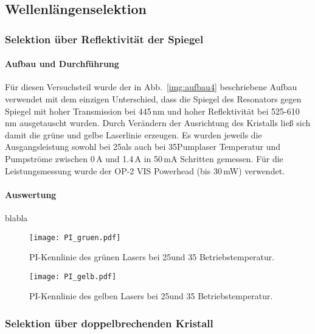 \subsection{Wellenlängenselektion}

\subsubsection{Selektion über Reflektivität der Spiegel}

\paragraph{Aufbau und Durchführung}

Für diesen Versuchsteil wurde der in Abb.~\ref{img:aufbau4} beschriebene Aufbau verwendet mit dem
einzigen Unterschied, dass die Spiegel des Resonators gegen Spiegel mit hoher Transmission bei
445\,nm und hoher Reflektivität bei 525-610\,nm ausgetauscht wurden.
Durch Verändern der Ausrichtung des Kristalls ließ sich damit die grüne und gelbe Laserlinie
erzeugen. Es wurden jeweils die Ausgangsleistung sowohl bei 25\grad als auch bei 35\grad Pumplaser
Temperatur und Pumpströme zwischen 0\,A und 1.4\,A in 50\,mA Schritten gemessen.
Für die Leistungsmessung wurde der OP-2 VIS Powerhead (bis 30\,mW) verwendet.





\paragraph{Auswertung}
blabla

\begin{figure}[H]
\begin{center}
  \texttt{[image: PI\_gruen.pdf]}
  \caption{PI-Kennlinie des grünen Lasers bei 25\grad und 35\grad
  Betriebstemperatur.}
  \label{img:PI_gruen}
\end{center}
\end{figure}


\begin{figure}[H]
\begin{center}
  \texttt{[image: PI\_gelb.pdf]}
  \caption{PI-Kennlinie des gelben Lasers bei 25\grad und 35\grad
  Betriebstemperatur.}
  \label{img:PI_gelb}
\end{center}
\end{figure}



\subsubsection{Selektion über doppelbrechenden Kristall}



